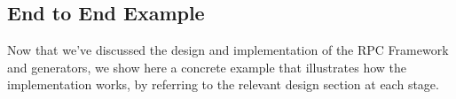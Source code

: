 \subsection{End to End Example} %
\label{sub:end_to_end_example}
Now that we've discussed the design and implementation of the RPC Framework and generators, we show here a concrete example that illustrates how the implementation works, by referring to the relevant design section at each stage.
